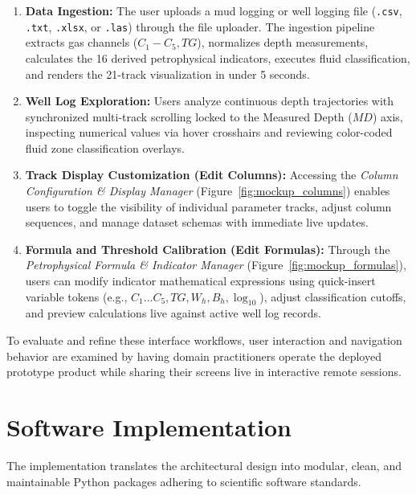 \begin{enumerate}
    \item \textbf{Data Ingestion:} 
    The user uploads a mud logging or well logging file (\texttt{.csv}, \texttt{.txt}, \texttt{.xlsx}, or \texttt{.las}) through the file uploader. The ingestion pipeline extracts gas channels ($C_1 - C_5, TG$), normalizes depth measurements, calculates the 16 derived petrophysical indicators, executes fluid classification, and renders the 21-track visualization in under 5 seconds.

    \item \textbf{Well Log Exploration:} 
    Users analyze continuous depth trajectories with synchronized multi-track scrolling locked to the Measured Depth ($MD$) axis, inspecting numerical values via hover crosshairs and reviewing color-coded fluid zone classification overlays.

    \item \textbf{Track Display Customization (Edit Columns):} 
    Accessing the \textit{Column Configuration \& Display Manager} (Figure~\ref{fig:mockup_columns}) enables users to toggle the visibility of individual parameter tracks, adjust column sequences, and manage dataset schemas with immediate live updates.

    \item \textbf{Formula and Threshold Calibration (Edit Formulas):} 
    Through the \textit{Petrophysical Formula \& Indicator Manager} (Figure~\ref{fig:mockup_formulas}), users can modify indicator mathematical expressions using quick-insert variable tokens (e.g., $C_1 \dots C_5, TG, W_h, B_h, \log_{10}$), adjust classification cutoffs, and preview calculations live against active well log records.
\end{enumerate}

To evaluate and refine these interface workflows, user interaction and navigation behavior are examined by having domain practitioners operate the deployed prototype product while sharing their screens live in interactive remote sessions.

\section{Software Implementation}

The implementation translates the architectural design into modular, clean, and maintainable Python packages adhering to scientific software standards.

